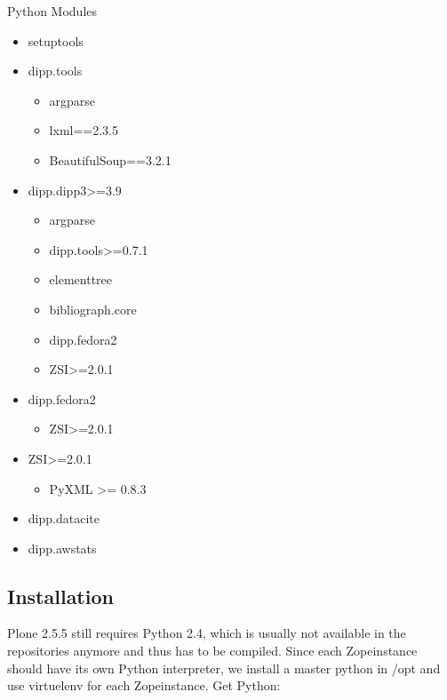 \documentclass[a4paper,10pt,ngerman]{sphinxmanual}
\begin{document}
Python Modules
\begin{itemize}
\item {} 
setuptools

\item {} 
dipp.tools
\begin{itemize}
\item {} 
argparse

\item {} 
lxml==2.3.5

\item {} 
BeautifulSoup==3.2.1

\end{itemize}

\item {} 
dipp.dipp3\textgreater{}=3.9
\begin{itemize}
\item {} 
argparse

\item {} 
dipp.tools\textgreater{}=0.7.1

\item {} 
elementtree

\item {} 
bibliograph.core

\item {} 
dipp.fedora2

\item {} 
ZSI\textgreater{}=2.0.1

\end{itemize}

\item {} 
dipp.fedora2
\begin{itemize}
\item {} 
ZSI\textgreater{}=2.0.1

\end{itemize}

\item {} 
ZSI\textgreater{}=2.0.1
\begin{itemize}
\item {} 
PyXML \textgreater{}= 0.8.3

\end{itemize}

\item {} 
dipp.datacite

\item {} 
dipp.awstats

\end{itemize}


\subsection{Installation}
\label{readme:installation}
Plone 2.5.5 still requires Python 2.4, which is usually not available in the
repositories anymore and thus has to be compiled. Since each Zopeinstance should
have its own Python interpreter, we install a master python in /opt and use
virtuelenv for each Zopeinstance. Get Python:
\end{document}
